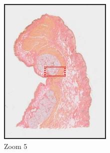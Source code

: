 \documentclass[a4paper,11pt]{report}
\numberwithin{figure}{section} %
\begin{document}
\begin{itemize}
\begin{figure}[H]
\begin{subfigure}[b]{0.3\textwidth}
            \includegraphics[width=\textwidth]{images/zooms5.png}
            \caption{Zoom 5}
            \end{subfigure}
            \begin{subfigure}[b]{0.3\textwidth}

\end{subfigure}
\end{figure}
\end{itemize}
\end{document}
